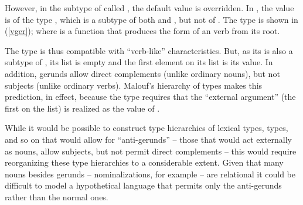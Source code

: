 \documentclass[output=paper
 	        ,biblatex
                ,babelshorthands
                ,newtxmath
                ,draftmode
                ,colorlinks, citecolor=brown
]{langscibook}
\begin{document}
\begin{exe}
\ex\label{v-def}
\end{exe}

However, in the subtype of  called , the default value  is overridden.  In , the  value is of the type , which is a subtype of both  and , but not of .
The type  is shown in (\ref{vger}); where  is a function that produces the  form of an  verb from its root.


\begin{exe}
\ex\label{vger}
\end{exe}

The type  is thus compatible with ``verb-like'' characteristics.
But, as its  is also a subtype of , its  list is empty and the first element on its  list is its  value. In addition, gerunds allow direct complements (unlike ordinary nouns), but not subjects (unlike ordinary verbs).
Malouf's hierarchy of types makes this prediction, in effect, because the  type requires that the ``external argument'' (the first on the  list) is realized as the value of .


While it would be possible to construct type hierarchies of lexical types,  types, and so on that would allow for ``anti-gerunds'' -- those that would act externally as nouns, allow subjects, but not permit direct complements -- this would require reorganizing these type hierarchies to a considerable extent.
Given that many nouns besides gerunds -- nominalizations, for example -- are relational it could be difficult to model a hypothetical language that permits only the anti-gerunds rather than the normal ones.
\end{document}
